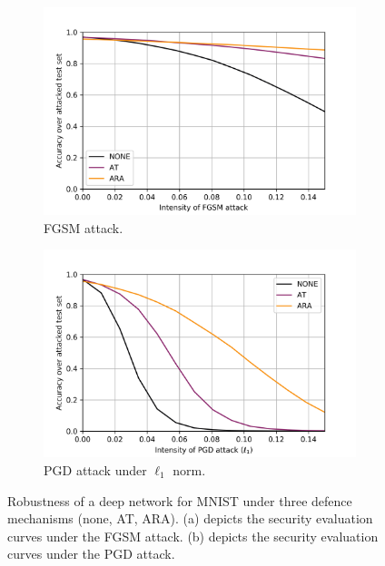 \begin{figure}[!htb]
    \centering
    \begin{subfigure}[b]{0.45\textwidth}
        \includegraphics[width=\textwidth]{figures/comparison_mnist_fgsm.png}
        \caption{FGSM attack.}
        \label{fig:sub1}
    \end{subfigure}
    \begin{subfigure}[b]{0.45\textwidth}
        \includegraphics[width=\textwidth]{figures/comparison_mnist_pgdl1.png}
        \caption{PGD attack under $\ell_1$ norm.}
        \label{fig:sub2}
    \end{subfigure}
    \caption{Robustness of a deep network for MNIST under three defence mechanisms 
(none, AT, ARA). (a) depicts the security evaluation curves under the FGSM attack. (b) depicts the security evaluation curves under the PGD attack.}\label{fig:comparison_mnist}
\end{figure}
\fi

